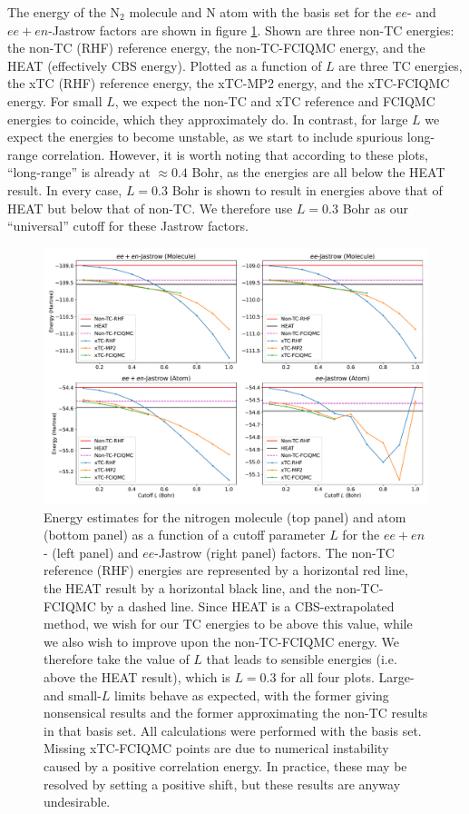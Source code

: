 The energy of the N$_2$ molecule and N atom with the \avtz basis set for the $ee$- and $ee+en$-Jastrow factors are shown in figure \ref{fig:fournais-cutoff-n2}. Shown are three non-TC energies: the non-TC (RHF) reference energy, the non-TC-FCIQMC energy, and the HEAT (effectively \gls{CBS} energy). Plotted as a function of $L$ are three TC energies, the xTC (RHF) reference energy, the xTC-MP2 energy, and the xTC-FCIQMC energy. For small $L$, we expect the non-TC and xTC reference and FCIQMC energies to coincide, which they approximately do. In contrast, for large $L$ we expect the energies to become unstable, as we start to include spurious long-range correlation. However, it is worth noting that according to these plots, ``long-range'' is already at $\approx 0.4$ Bohr, as the energies are all below the HEAT result. In every case, $L=0.3$ Bohr is shown to result in energies above that of HEAT but below that of non-TC. We therefore use $L=0.3$ Bohr as our ``universal'' cutoff for these Jastrow factors.

\begin{figure}[h!]
    \centering
    \includegraphics[width=\textwidth]{figures/universal/cutoffs_combined}
    \caption{Energy estimates for the nitrogen molecule (top panel) and atom (bottom panel) as a function of a cutoff parameter $L$ for the $ee+en$- (left panel) and $ee$-Jastrow (right panel) factors. The non-TC reference (RHF) energies are represented by a horizontal red line, the HEAT result by a horizontal black line, and the non-TC-FCIQMC by a dashed line. Since HEAT is a \gls{CBS}-extrapolated method, we wish for our TC energies to be above this value, while we also wish to improve upon the non-TC-FCIQMC energy. We therefore take the value of $L$ that leads to sensible energies (i.e. above the HEAT result), which is $L=0.3$ for all four plots. Large- and small-$L$ limits behave as expected, with the former giving nonsensical results and the former approximating the non-TC results in that basis set. All calculations were performed with the \avtz basis set. Missing xTC-FCIQMC points are due to numerical instability caused by a positive correlation energy. In practice, these may be resolved by setting a positive shift, but these results are anyway undesirable.}
    \label{fig:fournais-cutoff-n2}
\end{figure}

